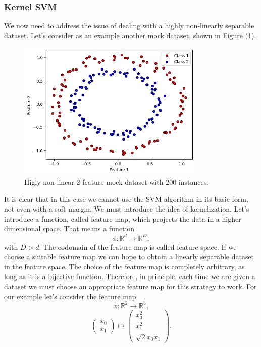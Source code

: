 \documentclass[12pt]{article}
\begin{document}
\subsubsection{Kernel SVM}
We now need to address the issue of dealing with a highly non-linearly separable dataset. Let's consider as an example another mock dataset, shown in Figure (\ref{fig:classical svm circles}). 
\begin{figure}[h!]
    \centering
    \includegraphics[width=0.8\textwidth]{images/circles.png}
    \caption{Higly non-linear 2 feature mock dataset with 200 instances.}
    \label{fig:classical svm circles}
\end{figure}
It is clear that in this case we cannot use the SVM algorithm in its basic form, not even with a soft margin. We must introduce the idea of kernelization. 
Let's introduce a function, called feature map, which projects the data in a higher dimensional space. That means a function
\begin{equation}
    \phi:\mathbb{R}^d\rightarrow\mathbb{R}^D,
\end{equation}
with $D>d$. The codomain of the feature map is called feature space. If we choose a suitable feature map we can hope to obtain a linearly separable dataset in the feature space. The choice of the feature map is completely arbitrary, as long as it is a bijective function. Therefore, in principle, each time we are given a dataset we must choose an appropriate feature map for this strategy to work. For our example let's consider the feature map
$$    \phi:\mathbb{R}^2\rightarrow\mathbb{R}^3,$$
\begin{equation}
    \begin{pmatrix}
        x_0\\
        x_1
        \end{pmatrix} \mapsto  
        \begin{pmatrix}
        x_0^2 \\
        x_1^2\\
        \sqrt{2}x_0x_1
        \end{pmatrix} .
\end{equation}
\end{document}
